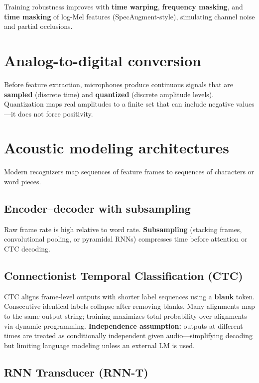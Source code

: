Training robustness improves with \textbf{time warping}, \textbf{frequency masking}, and \textbf{time masking} of log-Mel features (SpecAugment-style), simulating channel noise and partial occlusions.

\section{Analog-to-digital conversion}

Before feature extraction, microphones produce continuous signals that are \textbf{sampled} (discrete time) and \textbf{quantized} (discrete amplitude levels). Quantization maps real amplitudes to a finite set that can include negative values---it does not force positivity.

\section{Acoustic modeling architectures}

Modern recognizers map sequences of feature frames to sequences of characters or word pieces.

\subsection{Encoder--decoder with subsampling}

Raw frame rate is high relative to word rate. \textbf{Subsampling} (stacking frames, convolutional pooling, or pyramidal RNNs) compresses time before attention or CTC decoding.

\subsection{Connectionist Temporal Classification (CTC)}

CTC aligns frame-level outputs with shorter label sequences using a \textbf{blank} token. Consecutive identical labels collapse after removing blanks. Many alignments map to the same output string; training maximizes total probability over alignments via dynamic programming. \textbf{Independence assumption:} outputs at different times are treated as conditionally independent given audio---simplifying decoding but limiting language modeling unless an external LM is used.

\subsection{RNN Transducer (RNN-T)}

